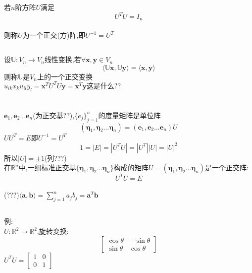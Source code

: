 \documentclass[11pt, a4paper, UTF8]{ctexart}
\begin{document}
\subsubsection{}
若$n$阶方阵$U$满足\\
\[U^TU=I_n\]\\
则称$U$为一个正交(方)阵,即$U^{-1}=U^T$\\
\subsection{}
设$\mathbb{U}:V_n\to V_n$线性变换,若$\forall\bm x,\bm y\in V_n$\\
\[\langle\mathbb{U}\bm x,\mathbb{U}\bm y\rangle=\langle\bm x,\bm y\rangle\]则称$\mathbb{U}$是$V_n$上的一个正交变换\\
$u_{ik}x_ku_{il}y_l=\bm x^TU^TU\bm y=\bm x^T\bm y\mbox{这是什么??}$\\
\section{}
\subsection{}
$\bm e_1,\bm e_2...\bm e_n$(为正交基??),$\{e_j\}_{j=1}^n$的度量矩阵是单位阵\\
\[(\bm\eta_1,\bm\eta_2...\bm\eta_n)=(\bm e_1,\bm e_2...\bm e_n)U\]
$UU^T=E$即$U^{-1}=U^T$\\
\[1=|E|=|U^TU|=|U^T||U|=|U|^2\]
所以$|U|=\pm1$(列???)\\
在$\mathbb{R}^n$中,一组标准正交基$\{\bm\eta_1,\bm\eta_2...\bm\eta_n\}$构成的矩阵$U=(\bm\eta_1,\bm\eta_2...\bm\eta_n)$是一个正交阵:\\
\[U^TU=E\]\\
(???)$\langle\bm a,\bm b\rangle=\sum_{j=1}^na_jb_j=\bm a^T\bm b$\\
\subsection{}
例:\\
$U:\mathbb{R}^2\to\mathbb{R}^2$,旋转变换:\\
\[\begin{bmatrix}
\cos\theta&-\sin\theta\\
\sin\theta&\cos\theta
\end{bmatrix}\]
$U^TU=\begin{bmatrix}
1&0\\
0&1
\end{bmatrix}$
\end{document}
